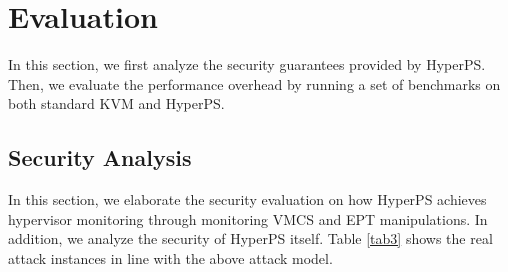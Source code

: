 \documentclass[conference]{IEEEtran}
\begin{document}
%
%





\section{Evaluation}\label{sec:evaluation}
In this section, we first analyze the security guarantees provided by HyperPS. Then, we evaluate the performance overhead by running a set of benchmarks on both standard KVM and HyperPS.



\subsection{Security Analysis}
 
In this section, we elaborate the security evaluation on how HyperPS achieves hypervisor monitoring through monitoring VMCS and EPT manipulations. 
In addition, we analyze the security of HyperPS itself. Table \ref{tab3} shows the real attack instances in line with the above attack model. 
\end{document}
